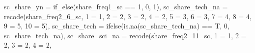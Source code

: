 \documentclass[
]{article}
\newenvironment{Shaded}{\begin{snugshade}}{\end{snugshade}}
\newcommand{\AttributeTok}[1]{\textcolor[rgb]{0.77,0.63,0.00}{#1}}
\newcommand{\DecValTok}[1]{\textcolor[rgb]{0.00,0.00,0.81}{#1}}
\newcommand{\FunctionTok}[1]{\textcolor[rgb]{0.00,0.00,0.00}{#1}}
\newcommand{\NormalTok}[1]{#1}
\newcommand{\OtherTok}[1]{\textcolor[rgb]{0.56,0.35,0.01}{#1}}
\newcommand{\SpecialCharTok}[1]{\textcolor[rgb]{0.00,0.00,0.00}{#1}}
\newcommand{\StringTok}[1]{\textcolor[rgb]{0.31,0.60,0.02}{#1}}
\begin{document}
\begin{Shaded}
\begin{Highlighting}[]
         \AttributeTok{sc\_share\_yn =} \FunctionTok{if\_else}\NormalTok{(share\_freq1\_sc }\SpecialCharTok{==} \DecValTok{1}\NormalTok{, }\DecValTok{0}\NormalTok{, }\DecValTok{1}\NormalTok{),}
         \AttributeTok{sc\_share\_tech\_na =} \FunctionTok{recode}\NormalTok{(share\_freq2\_6\_sc, }\StringTok{\textasciigrave{}}\AttributeTok{1}\StringTok{\textasciigrave{}} \OtherTok{=} \DecValTok{1}\NormalTok{,}
                                \StringTok{\textasciigrave{}}\AttributeTok{2}\StringTok{\textasciigrave{}} \OtherTok{=} \DecValTok{2}\NormalTok{,}
                                \StringTok{\textasciigrave{}}\AttributeTok{3}\StringTok{\textasciigrave{}} \OtherTok{=} \DecValTok{2}\NormalTok{,}
                                \StringTok{\textasciigrave{}}\AttributeTok{4}\StringTok{\textasciigrave{}} \OtherTok{=} \DecValTok{2}\NormalTok{,}
                                \StringTok{\textasciigrave{}}\AttributeTok{5}\StringTok{\textasciigrave{}} \OtherTok{=} \DecValTok{3}\NormalTok{,}
                                \StringTok{\textasciigrave{}}\AttributeTok{6}\StringTok{\textasciigrave{}} \OtherTok{=} \DecValTok{3}\NormalTok{,}
                                \StringTok{\textasciigrave{}}\AttributeTok{7}\StringTok{\textasciigrave{}} \OtherTok{=} \DecValTok{4}\NormalTok{,}
                                \StringTok{\textasciigrave{}}\AttributeTok{8}\StringTok{\textasciigrave{}} \OtherTok{=} \DecValTok{4}\NormalTok{,}
                                \StringTok{\textasciigrave{}}\AttributeTok{9}\StringTok{\textasciigrave{}} \OtherTok{=} \DecValTok{5}\NormalTok{,}
                                \StringTok{\textasciigrave{}}\AttributeTok{10}\StringTok{\textasciigrave{}} \OtherTok{=} \DecValTok{5}\NormalTok{),}
         \AttributeTok{sc\_share\_tech =} \FunctionTok{ifelse}\NormalTok{(}\FunctionTok{is.na}\NormalTok{(sc\_share\_tech\_na) }\SpecialCharTok{==}\NormalTok{ T, }\DecValTok{0}\NormalTok{, sc\_share\_tech\_na),}
         \AttributeTok{sc\_share\_sci\_na =} \FunctionTok{recode}\NormalTok{(share\_freq2\_11\_sc, }\StringTok{\textasciigrave{}}\AttributeTok{1}\StringTok{\textasciigrave{}} \OtherTok{=} \DecValTok{1}\NormalTok{,}
                                \StringTok{\textasciigrave{}}\AttributeTok{2}\StringTok{\textasciigrave{}} \OtherTok{=} \DecValTok{2}\NormalTok{,}
                                \StringTok{\textasciigrave{}}\AttributeTok{3}\StringTok{\textasciigrave{}} \OtherTok{=} \DecValTok{2}\NormalTok{,}
                                \StringTok{\textasciigrave{}}\AttributeTok{4}\StringTok{\textasciigrave{}} \OtherTok{=} \DecValTok{2}\NormalTok{,}

\end{Highlighting}
\end{Shaded}
\end{document}

